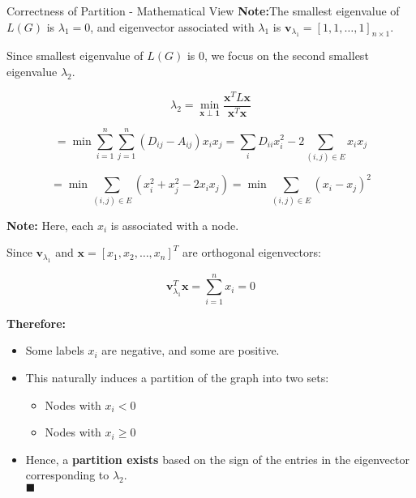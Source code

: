 \documentclass[aspectratio=169]{beamer}
\begin{document}
\begin{frame}{Correctness of Partition - Mathematical View}
    \textbf{Note:}The smallest eigenvalue of \( L(G) \) is \( \lambda_1 = 0 \), and eigenvector associated with \( \lambda_1 \) is \( \mathbf{v}_{\lambda_1} = [1, 1, \dots, 1]_{n \times 1} \).

    
    Since smallest eigenvalue of \( L(G) \) is \( 0 \), we focus on the second smallest eigenvalue \( \lambda_2 \).

    \[
    \lambda_2 = \min_{\mathbf{x} \perp \mathbf{1}} \frac{\mathbf{x}^T L \mathbf{x}}{\mathbf{x}^T \mathbf{x}}
    \]

    \[
    = \min \sum_{i=1}^n \sum_{j=1}^n (D_{ij} - A_{ij}) x_i x_j 
    = \sum_{i} D_{ii} x_i^2 - 2 \sum_{(i,j) \in E} x_i x_j
    \]

    \[
    = \min \sum_{(i,j) \in E} \left( x_i^2 + x_j^2 - 2 x_i x_j \right)
    = \min \sum_{(i,j) \in E} (x_i - x_j)^2
    \]

    \textbf{Note:} Here, each \( x_i \) is associated with a node.
\end{frame}

\begin{frame}
    Since \( \mathbf{v}_{\lambda_1} \) and \( \mathbf{x} = [x_1, x_2, \dots, x_n]^T \) are orthogonal eigenvectors:

    \[
    \mathbf{v}_{\lambda_1}^T \mathbf{x} = \sum_{i=1}^n x_i = 0
    \]

    \vspace{0.3cm}

    \textbf{Therefore:}
    \begin{itemize}
        \item Some labels \( x_i \) are negative, and some are positive.
        \item This naturally induces a partition of the graph into two sets:
        \begin{itemize}
            \item Nodes with \( x_i < 0 \)
            \item Nodes with \( x_i \geq 0 \)
        \end{itemize}
        \item Hence, a \textbf{partition exists} based on the sign of the entries in the eigenvector corresponding to \( \lambda_2 \).\\
        \hfill \(\blacksquare\)
    \end{itemize}
\end{frame}
\end{document}

